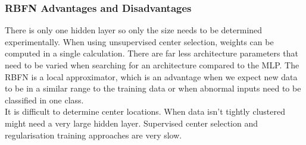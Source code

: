 \documentclass[a4paper, 11pt]{article}
\begin{document}
\subsubsection{RBFN Advantages and Disadvantages}
There is only one hidden layer so only the size needs to be determined experimentally. When using unsupervised center selection, weights can be computed in a single calculation. There are far less architecture parameters that need to be varied when searching for an  architecture compared to the MLP. The RBFN is a local approximator, which is an advantage when we expect new data to be in a similar range to the training data or when abnormal inputs need to be classified in one class. \\
It is difficult to determine center locations. When data isn't tightly clustered might need a very large hidden layer.  Supervised center selection and regularisation training approaches are very slow. 

\end{document}
